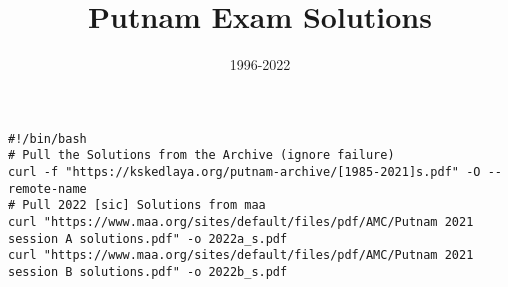 \documentclass{article}
\title{Putnam Exam Solutions}
\date{1996-2022}
\author{}
\begin{document}
\maketitle
\begin{center}
\begin{BVerbatim}
#!/bin/bash
# Pull the Solutions from the Archive (ignore failure)
curl -f "https://kskedlaya.org/putnam-archive/[1985-2021]s.pdf" -O --remote-name
# Pull 2022 [sic] Solutions from maa
curl "https://www.maa.org/sites/default/files/pdf/AMC/Putnam 2021 session A solutions.pdf" -o 2022a_s.pdf
curl "https://www.maa.org/sites/default/files/pdf/AMC/Putnam 2021 session B solutions.pdf" -o 2022b_s.pdf
\end{BVerbatim}
\end{center}
\newpage



















\end{document}
